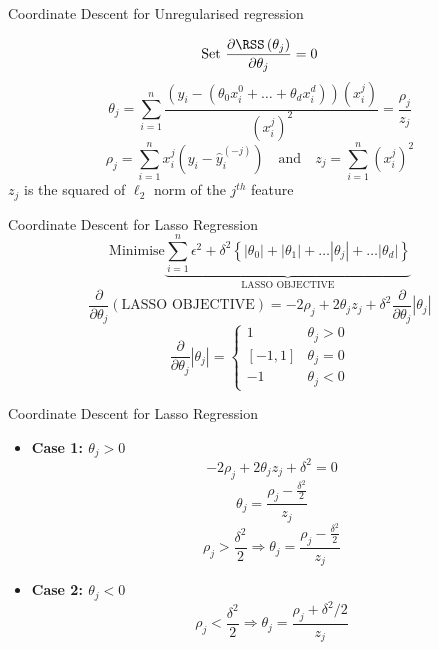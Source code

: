 \documentclass{beamer}
\begin{document}
\begin{frame}{Coordinate Descent for Unregularised regression}

\[
\text{Set } \frac{\partial \RSS\left(\theta_{j}\right)}{\partial \theta_{j}}= 0
\]
\[
\theta_{j}=\sum_{i=1}^{n} \frac{\left(y_{i}-\left(\theta_{0} x_{i}^{0}+\ldots + \theta_{d} x_{i}^{d}\right)\right)\left(x_{i}^{j}\right)}{\left(x_{i}^{j}\right)^{2}}= \frac{\rho_{j}}{z_{j}}
\]
\[
\rho_{j} =\sum_{i=1}^{n} x_{i}^{j}\left(y_{i}-{\hat{y}_{i}^{(-j)}}\right) \quad \text{and} \quad z_{j}=\sum_{i=1}^{n}\left(x_{i}^{j}\right)^{2}
\]
$z_{j}$ is the squared of $\ell_2$ norm of the $j^{th}$ feature
\end{frame}

%




\begin{frame}{Coordinate Descent for Lasso Regression}
\[
\text{Minimise} \underbrace{\sum_{i=1}^{n} \epsilon^{2} + \delta^{2}\left\{\left|\theta_{0}\right|+\left|\theta_{1}\right|+\ldots\left|\theta_{j}\right|+\ldots |\theta_{d}|\right\}}_{\text{LASSO OBJECTIVE}}
\]
\[
\frac{\partial}{\partial \theta_{j}}(\text {LASSO OBJECTIVE})=-2 \rho_{j}+2 \theta_{j} z_{j}+\delta^{2}{\frac{\partial}{\partial \theta_{j}}}\left|\theta_{j}\right|
\]
\[
\frac{\partial}{\partial \theta_{j}}\left|\theta_{j}\right|=\left\{\begin{array}{cc}
1 & \theta_{j}>0 \\
{[-1,1]} & \theta_{j}=0 \\
-1 & \theta_{j}<0
\end{array}\right.
\]
\end{frame}

\begin{frame}{Coordinate Descent for Lasso Regression}
\begin{itemize}[<+->]
\item \textbf{Case 1: $\theta_{j}>0$}
\[
-2\rho_j+2\theta_j z_j+\delta^{2}  = 0
\]
\[
\theta_j = \frac{\rho_j - \frac{\delta^{2}}{2}}{z_{j}}
\]
\[
\rho_{j}>\frac{\delta^{2}}{2} \Rightarrow  \theta_{j} = \frac{\rho_j - \frac{\delta^{2}}{2}}{z_{j}}
\]

\item \textbf{Case 2: $\theta_{j}<0$}
\begin{equation}
\rho_{j} < \frac{\delta^{2}}{2} \Rightarrow \theta_{j} = \frac{\rho_{j}+\delta^{2} / 2}{z_{j}}
\end{equation}
\end{itemize}

\end{frame}
\end{document}
